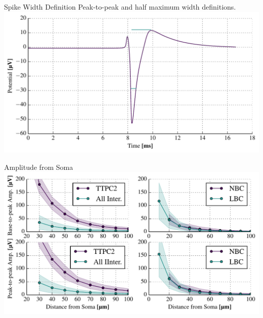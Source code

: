 \documentclass{beamer}
\begin{document}
\begin{frame}{Spike Width Definition}
    Peak-to-peak and half maximum width definitions.
    \centering
    \includegraphics[width=\textwidth]{images/widthdef_extracellular_1.pdf}
\end{frame}

\begin{frame}{Amplitude from Soma}
    \centering
    \includegraphics[width=\textwidth]{images/TTPC2_NBC_LBC_IN_amps.pdf}
\end{frame}
\end{document}
